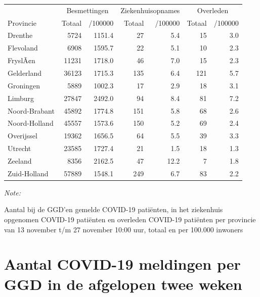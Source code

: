 \documentclass[
  english,
  man,floatsintext]{apa6}
\begin{document}
\begin{table}
\centering
\begin{threeparttable}
\begin{tabular}{lrrrrrr}
\toprule
\multicolumn{1}{c}{ } & \multicolumn{2}{c}{Besmettingen} & \multicolumn{2}{c}{Ziekenhuisopnames} & \multicolumn{2}{c}{Overleden} \\
\cmidrule(l{3pt}r{3pt}){2-3} \cmidrule(l{3pt}r{3pt}){4-5} \cmidrule(l{3pt}r{3pt}){6-7}
Provincie & Totaal & /100000 & Totaal & /100000 & Totaal & /100000\\
\midrule
Drenthe & 5724 & 1151.4 & 27 & 5.4 & 15 & 3.0\\
Flevoland & 6908 & 1595.7 & 22 & 5.1 & 10 & 2.3\\
FryslÃ¢n & 11231 & 1718.0 & 46 & 7.0 & 15 & 2.3\\
Gelderland & 36123 & 1715.3 & 135 & 6.4 & 121 & 5.7\\
Groningen & 5889 & 1002.3 & 17 & 2.9 & 18 & 3.1\\
Limburg & 27847 & 2492.0 & 94 & 8.4 & 81 & 7.2\\
Noord-Brabant & 45892 & 1774.8 & 151 & 5.8 & 68 & 2.6\\
Noord-Holland & 45557 & 1573.6 & 150 & 5.2 & 69 & 2.4\\
Overijssel & 19362 & 1656.5 & 64 & 5.5 & 39 & 3.3\\
Utrecht & 23585 & 1727.4 & 21 & 1.5 & 18 & 1.3\\
Zeeland & 8356 & 2162.5 & 47 & 12.2 & 7 & 1.8\\
Zuid-Holland & 57889 & 1548.1 & 249 & 6.7 & 83 & 2.2\\
\bottomrule
\end{tabular}
\begin{tablenotes}
\item \textit{Note: } 
\item Aantal bij de GGD’en gemelde COVID-19 patiënten, in het ziekenhuis opgenomen COVID-19 patiënten en overleden COVID-19 patiënten per provincie van 13 november t/m 27 november 10:00 uur, totaal en per 100.000 inwoners
\end{tablenotes}
\end{threeparttable}
\end{table}

\newpage

\hypertarget{aantal-covid-19-meldingen-per-ggd-in-de-afgelopen-twee-weken}{%
\section{Aantal COVID-19 meldingen per GGD in de afgelopen twee weken}\label{aantal-covid-19-meldingen-per-ggd-in-de-afgelopen-twee-weken}}
\end{document}

